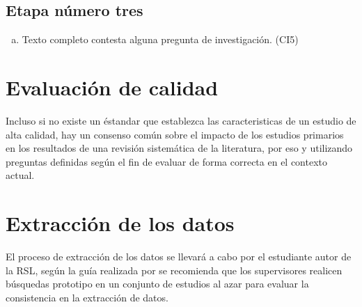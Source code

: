 \documentclass{article}
\begin{document}
\subsection{Etapa número tres}
\begin{enumerate}[(a)]
  \item{Texto completo contesta alguna pregunta de investigación. (CI5)}
\end{enumerate}
\newpage

\section{Evaluación de calidad}
Incluso si no existe un éstandar que establezca las caracteristicas de un estudio 
de alta calidad, hay un consenso común sobre el impacto de los estudios primarios 
en los resultados de una revisión sistemática de la literatura, por eso y utilizando 
preguntas definidas según \cite{kitchenham2007guidelines} el fin de evaluar de forma correcta en el contexto actual. 

\begin{center}
\begin{table}[ht]
        \caption{Calidad} 
        \centering 
        \label{table:tablacalidad}
\end{table}
\end{center}

\newpage

\section{Extracción de los datos}
El proceso de extracción de los datos se llevará a cabo por el estudiante autor de la RSL, según la guía realizada por
\cite{kitchenham2007guidelines} se recomienda que los supervisores realicen búsquedas prototipo en un conjunto de estudios al azar para evaluar la consistencia
en la extracción de datos.
\end{document}
